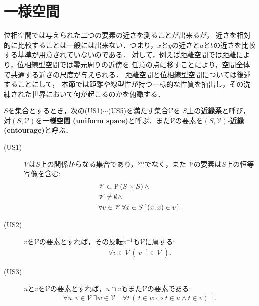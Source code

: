 \section{一様空間}
	位相空間では与えられた二つの要素の近さを測ることが出来るが，
	近さを相対的に比較することは一般には出来ない．つまり，$x$と$y$の近さと$a$と$b$の近さを比較する基準が用意されていないのである．
	対して，例えば距離空間では距離により，位相線型空間では零元周りの近傍を
	任意の点に移すことにより，空間全体で共通する近さの尺度が与えられる．
	距離空間と位相線型空間については後述することにして，
	本節では距離や線型性が持つ一様的な性質を抽出し，その洗練された世界において何が起こるのかを俯瞰する．
	
	\begin{screen}
		\begin{dfn}[近縁系]\label{dfn:uniform_structure}
			$S$を集合とするとき，次の(US1)$\sim$(US5)を満たす集合$\mathscr{V}$を
			$S$上の{\bf 近縁系}と呼び，
			対$(S,\mathscr{V})$を{\bf 一様空間}
			{\bf (uniform space)}と呼ぶ．また$\mathscr{V}$の要素を$(S,\mathscr{V})$-{\bf 近縁}
			{\bf (entourage)}と呼ぶ．
			\begin{description}
				\item[(US1)] $\mathscr{V}$は$S$上の関係からなる集合であり，空でなく，また
					$\mathscr{V}$の要素は$S$上の恒等写像を含む:
					\begin{align}
						&\mathscr{V} \subset \operatorname*{P} \left(S \times S\right) \wedge \\
						&\mathscr{V} \neq \emptyset \wedge \\
						&\forall v \in \mathscr{V}\, \forall x \in S\, [\,  (x,x) \in v\, ].
					\end{align}
					
				\item[(US2)] $v$を$\mathscr{V}$の要素とすれば，その反転$v^{-1}$も$\mathscr{V}$に属する:
					\begin{align}
						\forall v \in \mathscr{V}\, \left(\, v^{-1} \in \mathscr{V}\, \right).
					\end{align}
					
				\item[(US3)] $u$と$v$を$\mathscr{V}$の要素とすれば，$u \cap v$もまた$\mathscr{V}$の要素である:
					\begin{align}
						\forall u,v \in \mathscr{V}\, \exists w \in \mathscr{V}\, 
						\left[\, \forall t\, (\, t \in w \Longleftrightarrow t \in u \wedge t \in v)\, \right].
					\end{align}
					

\end{description}
\end{dfn}
\end{screen}
